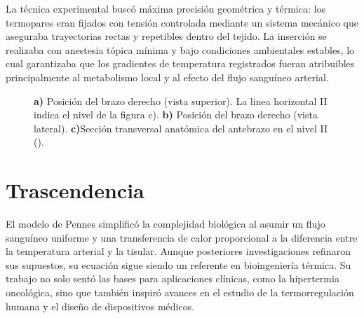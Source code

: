 \documentclass[
  spanish,
  us-letterpaper,
  DIV=11,
  numbers=noendperiod]{scrreprt}
\theoremstyle{definition}
\theoremstyle{plain}
\theoremstyle{remark}
\begin{document}
La técnica experimental buscó máxima precisión geométrica y térmica: los
termopares eran fijados con tensión controlada mediante un sistema
mecánico que aseguraba trayectorias rectas y repetibles dentro del
tejido. La inserción se realizaba con anestesia tópica mínima y bajo
condiciones ambientales estables, lo cual garantizaba que los gradientes
de temperatura registrados fueran atribuibles principalmente al
metabolismo local y al efecto del flujo sanguíneo arterial.

\begin{figure}


\caption{\label{fig-pennes_art}\textbf{a)} Posición del brazo derecho
(vista superior). La linea horizontal II indica el nivel de la figura
c). \textbf{b)} Posición del brazo derecho (vista lateral).
\textbf{c)}Sección transversal anatómica del antebrazo en el nivel II
().}

\end{figure}%

\section*{Trascendencia}\label{trascendencia}


El modelo de Pennes simplificó la complejidad biológica al asumir un
flujo sanguíneo uniforme y una transferencia de calor proporcional a la
diferencia entre la temperatura arterial y la tisular. Aunque
posteriores investigaciones refinaron sus supuestos, su ecuación sigue
siendo un referente en bioingeniería térmica. Su trabajo no solo sentó
las bases para aplicaciones clínicas, como la hipertermia oncológica,
sino que también inspiró avances en el estudio de la termorregulación
humana y el diseño de dispositivos médicos.
\end{document}
